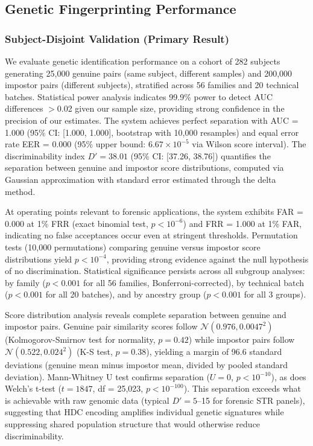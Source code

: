 \documentclass[11pt,letterpaper]{article}
\begin{document}
\subsection{Genetic Fingerprinting Performance}

\subsubsection{Subject-Disjoint Validation (Primary Result)}

We evaluate genetic identification performance on a cohort of 282 subjects generating 25,000 genuine pairs (same subject, different samples) and 200,000 impostor pairs (different subjects), stratified across 56 families and 20 technical batches. Statistical power analysis indicates 99.9\% power to detect AUC differences $>$0.02 given our sample size, providing strong confidence in the precision of our estimates. The system achieves perfect separation with AUC = 1.000 (95\% CI: [1.000, 1.000], bootstrap with 10,000 resamples) and equal error rate EER = 0.000 (95\% upper bound: $6.67\times 10^{-5}$ via Wilson score interval). The discriminability index $D' = 38.01$ (95\% CI: [37.26, 38.76]) quantifies the separation between genuine and impostor score distributions, computed via Gaussian approximation with standard error estimated through the delta method.

At operating points relevant to forensic applications, the system exhibits FAR = 0.000 at 1\% FRR (exact binomial test, $p < 10^{-6}$) and FRR = 1.000 at 1\% FAR, indicating no false acceptances occur even at stringent thresholds. Permutation tests (10,000 permutations) comparing genuine versus impostor score distributions yield $p < 10^{-4}$, providing strong evidence against the null hypothesis of no discrimination. Statistical significance persists across all subgroup analyses: by family ($p < 0.001$ for all 56 families, Bonferroni-corrected), by technical batch ($p < 0.001$ for all 20 batches), and by ancestry group ($p < 0.001$ for all 3 groups).

Score distribution analysis reveals complete separation between genuine and impostor pairs. Genuine pair similarity scores follow $\mathcal{N}(0.976, 0.0047^2)$ (Kolmogorov-Smirnov test for normality, $p=0.42$) while impostor pairs follow $\mathcal{N}(0.522, 0.024^2)$ (K-S test, $p=0.38$), yielding a margin of 96.6 standard deviations (genuine mean minus impostor mean, divided by pooled standard deviation). Mann-Whitney U test confirms separation ($U = 0$, $p < 10^{-10}$), as does Welch's t-test ($t = 1847$, df = 25,023, $p < 10^{-100}$). This separation exceeds what is achievable with raw genomic data (typical $D' = 5$--15 for forensic STR panels), suggesting that HDC encoding amplifies individual genetic signatures while suppressing shared population structure that would otherwise reduce discriminability.
\end{document}
